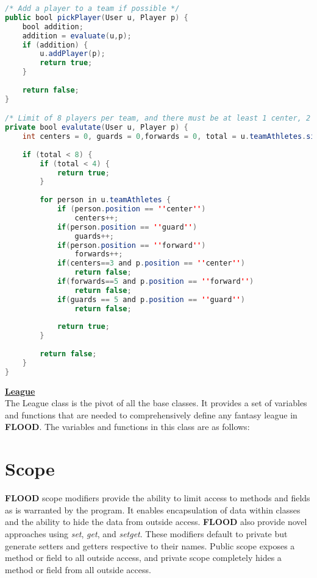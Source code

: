 \documentclass[12pt]{report}
\begin{document}
\begin{lstlisting}[language=Java,label=some-code,caption=Action]
/* Add a player to a team if possible */
public bool pickPlayer(User u, Player p) {
	bool addition;
	addition = evaluate(u,p);
	if (addition) {
		u.addPlayer(p);
		return true;
	}
	
	return false;
}

/* Limit of 8 players per team, and there must be at least 1 center, 2 guards and 2 forwards per team. */
private bool evalutate(User u, Player p) {
	int centers = 0, guards = 0,forwards = 0, total = u.teamAthletes.size();
	
	if (total < 8) {
		if (total < 4) {
			return true;
		}
		
		for person in u.teamAthletes {
			if (person.position == ''center'')
				centers++;
			if(person.position == ''guard'')
				guards++;
			if(person.position == ''forward'')
				forwards++;
			if(centers==3 and p.position == ''center'')
				return false;
			if(forwards==5 and p.position == ''forward'')
				return false;
			if(guards == 5 and p.position == ''guard'')
				return false;
				
			return true;
		}
		
		return false;
	}
}
\end{lstlisting}

\begin{doublespace}
\textbf{\underline{League}}
\\
The League class is the pivot of all the base classes. It provides a set of variables and functions that are needed to comprehensively define any fantasy league in \textbf{FLOOD}. The variables and functions in this class are as follows:


\end{doublespace}

\section{Scope}

\begin{doublespace}
\textbf{FLOOD} scope modifiers provide the ability to limit access to methods and fields as is warranted by the program. It enables encapsulation of data within classes and the ability to hide the data from outside access. \textbf{FLOOD} also provide novel approaches using \textit{set}, \textit{get}, and \textit{setget}. These modifiers default to private but generate setters and getters respective to their names.  Public scope exposes a method or field to all outside access, and private scope completely hides a method or field from all outside access.
\end{doublespace}
\end{document}
